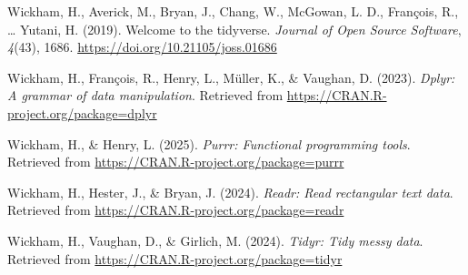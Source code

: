 \documentclass[
  man,floatsintext]{apa6}
\newlength{\cslhangindent}
\newenvironment{CSLReferences}[2] %
 {\begin{list}{}{%
  \setlength{\itemindent}{0pt}
  \setlength{\leftmargin}{0pt}
  \setlength{\parsep}{0pt}
  \ifodd #1
   \setlength{\leftmargin}{\cslhangindent}
   \setlength{\itemindent}{-1\cslhangindent}
  \fi
  \setlength{\itemsep}{#2\baselineskip}}}
 {\end{list}}
\begin{document}
\begin{CSLReferences}{1}{0}
Wickham, H., Averick, M., Bryan, J., Chang, W., McGowan, L. D., François, R., \ldots{} Yutani, H. (2019). Welcome to the {tidyverse}. \emph{Journal of Open Source Software}, \emph{4}(43), 1686. \url{https://doi.org/10.21105/joss.01686}

Wickham, H., François, R., Henry, L., Müller, K., \& Vaughan, D. (2023). \emph{Dplyr: A grammar of data manipulation}. Retrieved from \url{https://CRAN.R-project.org/package=dplyr}

Wickham, H., \& Henry, L. (2025). \emph{Purrr: Functional programming tools}. Retrieved from \url{https://CRAN.R-project.org/package=purrr}

Wickham, H., Hester, J., \& Bryan, J. (2024). \emph{Readr: Read rectangular text data}. Retrieved from \url{https://CRAN.R-project.org/package=readr}

Wickham, H., Vaughan, D., \& Girlich, M. (2024). \emph{Tidyr: Tidy messy data}. Retrieved from \url{https://CRAN.R-project.org/package=tidyr}

\end{CSLReferences}
\end{document}

